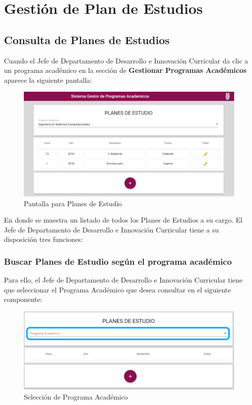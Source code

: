 
\section{Gestión de Plan de Estudios}
\subsection{Consulta de Planes de Estudios}
Cuando el Jefe de Departamento de Desarrollo e Innovación Curricular da clic a un programa académico en la sección de \textbf{Gestionar Programas Académicos} aparece la siguiente pantalla: 


\begin{figure}[!hbtp]
	\centering
	\hypertarget{consultarPE}{\includegraphics[width=0.7\linewidth]{images/SP4-GPE/consultar}}
	\caption{Pantalla para Planes de Estudio}
	\label{consultarPE}
\end{figure}

En donde se muestra un listado de todos los Planes de Estudios a su cargo. El Jefe de Departamento de Desarrollo e Innovación Curricular tiene a su disposición tres funciones:

\subsubsection{Buscar Planes de Estudio según el programa académico}

Para ello, el Jefe de Departamento de Desarrollo e Innovación Curricular tiene que seleccionar el Programa Académico que desea consultar en el siguiente componente:

\begin{figure}[!hbtp]
	\centering
	\hypertarget{academico}{\includegraphics[width=0.7\linewidth]{images/SP4-GPE/programa}}
	\caption{Selección de Programa Académico}
	\label{academico}
\end{figure}

